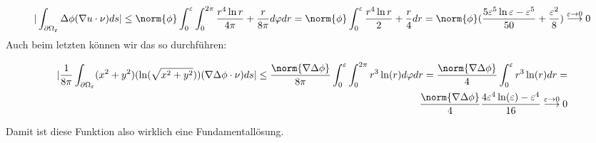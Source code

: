 \begin{solution}
\begin{align*}
  |\int_{\partial \Omega_\varepsilon} \Delta \phi (\nabla u \cdot \nu) ds|
  \leq
  \norm{\phi}  \int_0^\varepsilon \int_0^{2 \pi} \frac{r^4\ln{r}}{4\pi} + \frac{r}{8\pi} d\varphi dr
  =
  \norm{\phi} \int_0^\varepsilon \frac{r^4\ln{r}}{2} + \frac{r}{4} dr
  =
  \norm{\phi}(\frac{5\varepsilon^5 \ln{\varepsilon} - \varepsilon^5}{50} + \frac{\varepsilon^2}{8})
  \stackrel{\varepsilon \rightarrow 0}{\longrightarrow}
  0
\end{align*}
Auch beim letzten können wir das so durchführen:

\begin{align*}
  |\frac{1}{8\pi} \int_{\partial \Omega_\varepsilon} (x^2 + y^2)(\ln(\sqrt{x^2 + y^2})) (\nabla \Delta \phi \cdot \nu) ds|
  \leq
  \frac{\norm{\nabla \Delta \phi}}{8 \pi} \int_0^\varepsilon \int_0^{2 \pi} r^3 \ln(r) d\varphi dr
  =
  \frac{\norm{\nabla \Delta \phi}}{4} \int_0^\varepsilon r^3 \ln(r) dr
  =\\
  \frac{\norm{\nabla \Delta \phi}}{4} \frac{4 \varepsilon^4 \ln(\varepsilon) - \varepsilon^4 }{16}
  \stackrel{\varepsilon \rightarrow 0}{\longrightarrow}
  0
\end{align*}

Damit ist diese Funktion also wirklich eine Fundamentallösung.

\end{solution}

